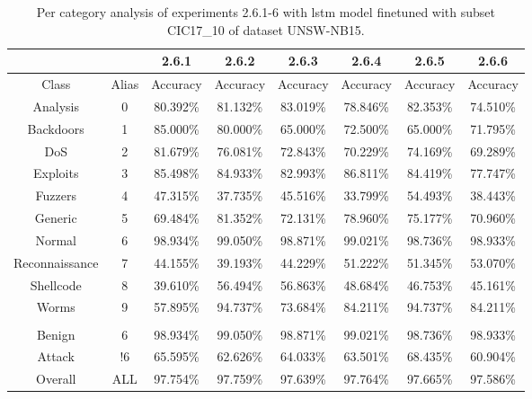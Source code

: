 \begin{table}[htb]
    \centering
    \begin{tabular}{@{}cccccccc@{}}
        \toprule
         &  & 2.6.1 & 2.6.2 & 2.6.3 & 2.6.4 & 2.6.5 & 2.6.6 \\
        \midrule
        Class &  Alias &  Accuracy &  Accuracy &  Accuracy &  Accuracy &  Accuracy &  Accuracy \\
        Analysis &  0 &  80.392\% &  81.132\% &  83.019\% &  78.846\% &  82.353\% &  74.510\% \\
        Backdoors &  1 &  85.000\% &  80.000\% &  65.000\% &  72.500\% &  65.000\% &  71.795\% \\
        DoS &  2 &  81.679\% &  76.081\% &  72.843\% &  70.229\% &  74.169\% &  69.289\% \\
        Exploits &  3 &  85.498\% &  84.933\% &  82.993\% &  86.811\% &  84.419\% &  77.747\% \\
        Fuzzers &  4 &  47.315\% &  37.735\% &  45.516\% &  33.799\% &  54.493\% &  38.443\% \\
        Generic &  5 &  69.484\% &  81.352\% &  72.131\% &  78.960\% &  75.177\% &  70.960\% \\
        Normal &  6 &  98.934\% &  99.050\% &  98.871\% &  99.021\% &  98.736\% &  98.933\% \\
        Reconnaissance &  7 &  44.155\% &  39.193\% &  44.229\% &  51.222\% &  51.345\% &  53.070\% \\
        Shellcode &  8 &  39.610\% &  56.494\% &  56.863\% &  48.684\% &  46.753\% &  45.161\% \\
        Worms &  9 &  57.895\% &  94.737\% &  73.684\% &  84.211\% &  94.737\% &  84.211\% \\
         \\
        Benign &  6 &  98.934\% &  99.050\% &  98.871\% &  99.021\% &  98.736\% &  98.933\% \\
        Attack &  !6 &  65.595\% &  62.626\% &  64.033\% &  63.501\% &  68.435\% &  60.904\% \\
        Overall &  ALL &  97.754\% &  97.759\% &  97.639\% &  97.764\% &  97.665\% &  97.586\% \\
        \bottomrule
    \end{tabular}
    \caption{Per category analysis of experiments 2.6.1-6 with \gls{lstm} model finetuned with subset CIC17\_10 of dataset UNSW-NB15.}
    \label{table:results:lstm:class_flows15_subset}
\end{table}